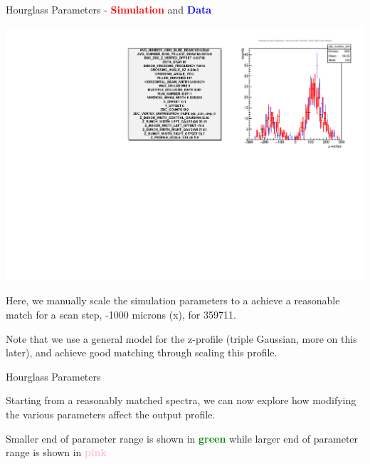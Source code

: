 \begin{frame}{Hourglass Parameters - \textcolor{red}{\textbf{Simulation}} and
	\textcolor{blue}{\textbf{Data}}}
\begin{center}
\includegraphics[scale=0.5]{../HourglassParameterSpace/figs/zvertex_compare_hscan_pos_1000_359711.pdf}
\end{center}

Here, we manually scale the simulation parameters to a achieve a reasonable
match for a scan step, -1000 microns (x), for 359711.

\vspace{\baselineskip}

Note that we use a general model for the z-profile (triple Gaussian, more on
this later), and achieve good matching through scaling this profile.
\end{frame}

\begin{frame}{Hourglass Parameters}

Starting from a reasonably matched spectra, we can now explore how modifying the
various parameters affect the output profile. 

\vspace{\baselineskip}

Smaller end of parameter range is shown in \textcolor{green}{\textbf{green}}
while larger end of parameter range is shown in \textcolor{pink}{\textbf{pink}}
\end{frame}

